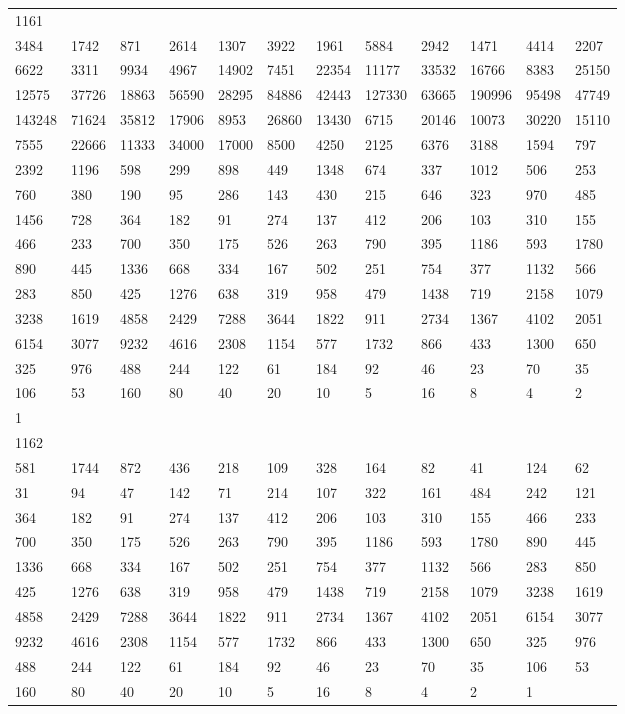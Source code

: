 \begin{longtable}{llllllllllll}
1161&&&&&&&&&&&\\
3484& 1742& 871& 2614& 1307& 3922& 1961& 5884& 2942& 1471& 4414& 2207\\
6622& 3311& 9934& 4967& 14902& 7451& 22354& 11177& 33532& 16766& 8383& 25150\\
12575& 37726& 18863& 56590& 28295& 84886& 42443& 127330& 63665& 190996& 95498& 47749\\
143248& 71624& 35812& 17906& 8953& 26860& 13430& 6715& 20146& 10073& 30220& 15110\\
7555& 22666& 11333& 34000& 17000& 8500& 4250& 2125& 6376& 3188& 1594& 797\\
2392& 1196& 598& 299& 898& 449& 1348& 674& 337& 1012& 506& 253\\
760& 380& 190& 95& 286& 143& 430& 215& 646& 323& 970& 485\\
1456& 728& 364& 182& 91& 274& 137& 412& 206& 103& 310& 155\\
466& 233& 700& 350& 175& 526& 263& 790& 395& 1186& 593& 1780\\
890& 445& 1336& 668& 334& 167& 502& 251& 754& 377& 1132& 566\\
283& 850& 425& 1276& 638& 319& 958& 479& 1438& 719& 2158& 1079\\
3238& 1619& 4858& 2429& 7288& 3644& 1822& 911& 2734& 1367& 4102& 2051\\
6154& 3077& 9232& 4616& 2308& 1154& 577& 1732& 866& 433& 1300& 650\\
325& 976& 488& 244& 122& 61& 184& 92& 46& 23& 70& 35\\
106& 53& 160& 80& 40& 20& 10& 5& 16& 8& 4& 2\\
1& \\

1162&&&&&&&&&&&\\
581& 1744& 872& 436& 218& 109& 328& 164& 82& 41& 124& 62\\
31& 94& 47& 142& 71& 214& 107& 322& 161& 484& 242& 121\\
364& 182& 91& 274& 137& 412& 206& 103& 310& 155& 466& 233\\
700& 350& 175& 526& 263& 790& 395& 1186& 593& 1780& 890& 445\\
1336& 668& 334& 167& 502& 251& 754& 377& 1132& 566& 283& 850\\
425& 1276& 638& 319& 958& 479& 1438& 719& 2158& 1079& 3238& 1619\\
4858& 2429& 7288& 3644& 1822& 911& 2734& 1367& 4102& 2051& 6154& 3077\\
9232& 4616& 2308& 1154& 577& 1732& 866& 433& 1300& 650& 325& 976\\
488& 244& 122& 61& 184& 92& 46& 23& 70& 35& 106& 53\\
160& 80& 40& 20& 10& 5& 16& 8& 4& 2& 1& \\


\end{longtable}
